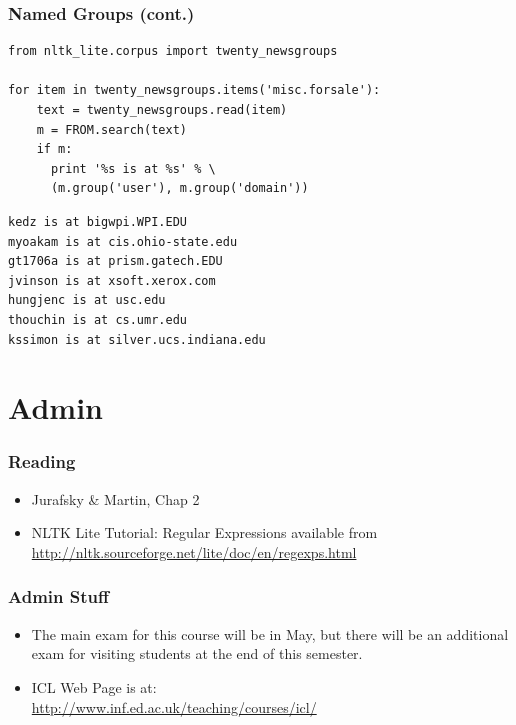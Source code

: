 \begin{frame}[fragile]
\frametitle{Named Groups (cont.)}
{\small
\begin{verbatim}
from nltk_lite.corpus import twenty_newsgroups

for item in twenty_newsgroups.items('misc.forsale'):
    text = twenty_newsgroups.read(item)
    m = FROM.search(text)
    if m:
      print '%s is at %s' % \
      (m.group('user'), m.group('domain'))
\end{verbatim}
}
\begin{verbatim}
kedz is at bigwpi.WPI.EDU
myoakam is at cis.ohio-state.edu
gt1706a is at prism.gatech.EDU
jvinson is at xsoft.xerox.com
hungjenc is at usc.edu
thouchin is at cs.umr.edu
kssimon is at silver.ucs.indiana.edu
\end{verbatim}
\end{frame}

\section{Admin}



\begin{frame}[fragile]
\frametitle{Reading}



\begin{itemize}
  \item {\large Jurafsky \& Martin, Chap 2}
  \item {\large NLTK Lite Tutorial: Regular Expressions}
available from 
\url{http://nltk.sourceforge.net/lite/doc/en/regexps.html}
\end{itemize}


\end{frame}

\begin{frame}[fragile]
\frametitle{Admin Stuff}



\begin{itemize}
\item The main exam for this course will be in May, but there will be
  an additional exam for visiting students at the end of this
  semester.
  \item ICL Web Page is at: \\
\url{http://www.inf.ed.ac.uk/teaching/courses/icl/}
\end{itemize}


\end{frame}









